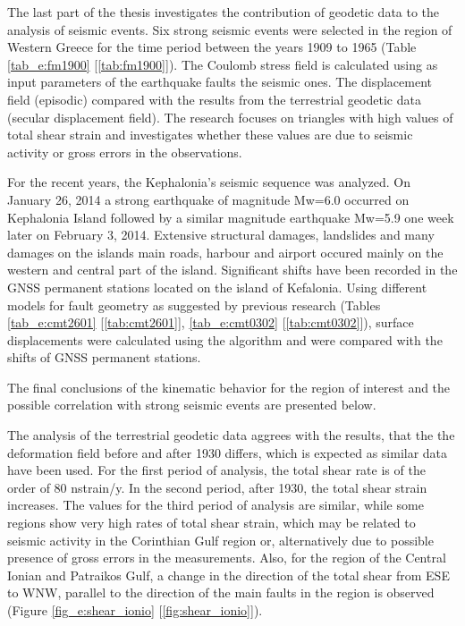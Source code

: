 \begin{extsum}
The last part of the thesis investigates the contribution of geodetic data to the analysis of seismic events. Six strong seismic events were selected in the region of Western Greece for the time period between the years 1909 to 1965 (Table \ref{tab_e:fm1900} [\ref{tab:fm1900}]). The Coulomb stress field is calculated using as input parameters of the earthquake faults the seismic ones. The displacement field (episodic) compared with the results from the terrestrial geodetic data (secular displacement field). The research focuses on triangles with high values ​​of total shear strain and investigates whether these values ​​are due to seismic activity or gross errors in the observations.

For the recent years, the Kephalonia's seismic sequence was analyzed. On January 26, 2014 a strong earthquake of magnitude Mw=6.0 occurred on Kephalonia Island followed by a similar magnitude earthquake Mw=5.9 one week later on February 3, 2014. Extensive structural damages, landslides and many damages on the islands main roads, harbour and airport occured mainly on the western and central part of the island. Significant shifts have been recorded in the GNSS permanent stations located on the island of Kefalonia. Using different models for fault geometry as suggested by previous research (Tables \ref{tab_e:cmt2601} [\ref{tab:cmt2601}], \ref{tab_e:cmt0302} [\ref{tab:cmt0302}]), surface displacements were calculated using the \citet{Okada1985} algorithm and were compared with the shifts of GNSS permanent stations.

The final conclusions  of the kinematic behavior for the region of interest and the possible correlation with strong seismic events are presented below.

The analysis of the terrestrial geodetic data aggrees with the \citet{stiros1993283} results, that the the deformation field before and after 1930 differs, which is expected as similar data have been used. For the first period of analysis, the total shear rate is of the order of 80 nstrain/y. In the second period, after 1930, the total shear strain increases. The values ​for the third period of analysis are similar, while some regions show very high rates of total shear strain, which may be related to seismic activity in the Corinthian Gulf region or, alternatively due to possible presence of gross errors in the measurements. Also, for the region of ​​the Central Ionian and Patraikos Gulf, a change in the direction of the total shear from ESE to WNW, parallel to the direction of the main faults in the region is observed (Figure \ref{fig_e:shear_ionio} [\ref{fig:shear_ionio}]).


\end{extsum}

